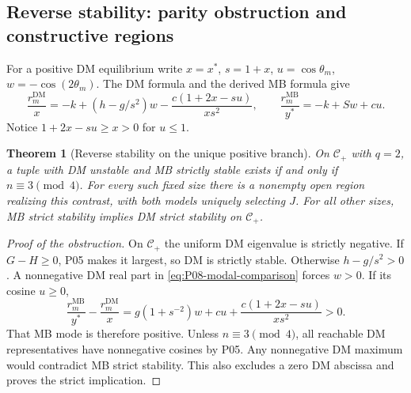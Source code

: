 \documentclass[11pt]{article}
\newcommand{\DM}{\mathrm{DM}}
\newcommand{\MB}{\mathrm{MB}}
\newtheorem{theorem}{Theorem}[section]
\theoremstyle{definition}
\theoremstyle{remark}
\begin{document}
\subsection{Reverse stability: parity obstruction and constructive regions}
For a positive DM equilibrium write $x=x^*$, $s=1+x$,
$u=\cos\theta_m$, $w=-\cos(2\theta_m)$. The DM formula and
the derived MB formula give
\begin{equation}
 \frac{r_m^{\DM}}x=-k+(h-g/s^2)w
       -\frac{c(1+2x-su)}{xs^2},\qquad
 \frac{r_m^{\MB}}{y^*}=-k+Sw+cu.
 \label{eq:P08-modal-comparison}
\end{equation}
Notice $1+2x-su\ge x>0$ for $u\le1$.
\begin{theorem}[Reverse stability on the unique positive branch]
\label{thm:P08-reverse}
On $\mathcal C_+$ with $q=2$, a tuple with DM unstable and MB strictly
stable exists if and only if $n\equiv3\pmod4$. For every such fixed
size there is a nonempty open region realizing this contrast, with both
models uniquely selecting $J$. For all other sizes, MB strict stability
implies DM strict stability on $\mathcal C_+$.
\end{theorem}
\begin{proof}[Proof of the obstruction]
On $\mathcal C_+$ the uniform DM eigenvalue is strictly negative.
If $G-H\ge0$, P05 makes it largest, so DM is strictly stable.
Otherwise $h-g/s^2>0$. A nonnegative DM real part in
\eqref{eq:P08-modal-comparison} forces $w>0$. If its cosine $u\ge0$,
\begin{equation}
 \frac{r_m^{\MB}}{y^*}-\frac{r_m^{\DM}}x
 =g(1+s^{-2})w+cu+\frac{c(1+2x-su)}{xs^2}>0.
 \label{eq:P08-modal-gap}
\end{equation}
That MB mode is therefore positive. Unless $n\equiv3\pmod4$, all
reachable DM representatives have nonnegative cosines by P05. Any
nonnegative DM maximum would contradict MB strict stability. This also
excludes a zero DM abscissa and proves the strict implication.
\end{proof}
\end{document}
